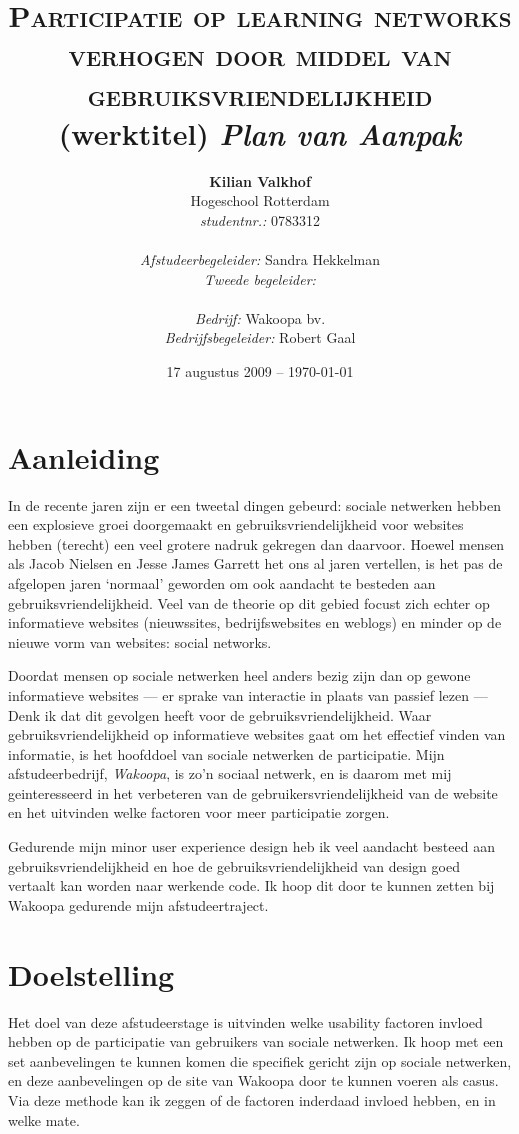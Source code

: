 \documentclass[a4paper, 10pt, pdftex]{article}
\title{\textsc{Participatie op learning networks verhogen door middel van gebruiksvriendelijkheid} \linebreak (werktitel) \linebreak \emph{Plan van Aanpak}}
\author{\textbf{Kilian Valkhof}\\
  Hogeschool Rotterdam\\
  \textit{studentnr.:} 0783312\\
  \\
  \textit{Afstudeerbegeleider:} Sandra Hekkelman\\
  \textit{Tweede begeleider:}\\
  \\
  \textit{Bedrijf:} Wakoopa bv.\\
  \textit{Bedrijfsbegeleider:} Robert Gaal}
\date{17 augustus 2009 -- \today}
\begin{document}
  \normalem
  \maketitle

  \newpage
  \tableofcontents

  \newpage
\section{Aanleiding}
In de recente jaren zijn er een tweetal dingen gebeurd: sociale netwerken hebben een explosieve groei doorgemaakt
en gebruiksvriendelijkheid voor websites hebben (terecht) een veel grotere nadruk gekregen dan daarvoor. Hoewel mensen
als Jacob Nielsen en Jesse James Garrett het ons al jaren vertellen, is het pas de afgelopen jaren `normaal' geworden
om ook aandacht te besteden aan gebruiksvriendelijkheid. Veel van de theorie op dit gebied focust zich echter op
informatieve websites (nieuwssites, bedrijfswebsites en weblogs) en minder op de nieuwe vorm van websites: social networks.

Doordat mensen op sociale netwerken heel anders bezig zijn dan op gewone informatieve websites --- er sprake van interactie in plaats van passief lezen --- Denk ik dat dit gevolgen heeft voor de gebruiksvriendelijkheid. Waar gebruiksvriendelijkheid op informatieve websites gaat om het effectief vinden van informatie, is het hoofddoel van sociale netwerken de participatie. Mijn afstudeerbedrijf, \emph{Wakoopa}, is zo'n sociaal netwerk, en is daarom met mij geinteresseerd in het verbeteren van de gebruikersvriendelijkheid van de website en het uitvinden welke factoren voor meer participatie zorgen.

Gedurende mijn minor user experience design heb ik veel aandacht besteed aan gebruiksvriendelijkheid en hoe de gebruiksvriendelijkheid van design
goed vertaalt kan worden naar werkende code. Ik hoop dit door te kunnen zetten bij Wakoopa gedurende mijn afstudeertraject.

\section{Doelstelling}
    Het doel van deze afstudeerstage is uitvinden welke usability factoren invloed hebben op de participatie van gebruikers van sociale netwerken. Ik hoop met een set aanbevelingen te kunnen komen die specifiek gericht zijn op sociale netwerken, en deze aanbevelingen op de site van Wakoopa door te kunnen voeren als casus. Via deze methode kan ik zeggen of de factoren inderdaad invloed hebben, en in welke mate.
\end{document}
